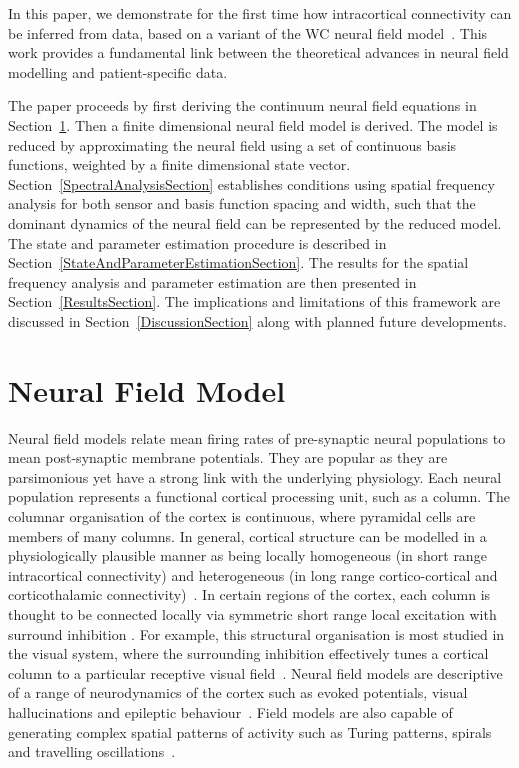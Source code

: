 \documentclass[10pt,a4paper]{article}
\begin{document}
In this paper, we demonstrate for the first time how intracortical connectivity can be inferred from data, based on a variant of the WC neural field model~\cite{Wilson1973}. This work provides a fundamental link between the theoretical advances in neural field modelling and patient-specific data.

The paper proceeds by first deriving the continuum neural field equations in Section~\ref{NeuralModelSection}. Then a finite dimensional neural field model is derived. The model is reduced by approximating the neural field using a set of continuous basis functions, weighted by a finite dimensional state vector. Section~\ref{SpectralAnalysisSection} establishes conditions using spatial frequency analysis for both sensor and basis function spacing and width, such that the dominant dynamics of the neural field can be represented by the reduced model. The state and parameter estimation procedure is described in Section~\ref{StateAndParameterEstimationSection}. The results for the spatial frequency analysis and parameter estimation are then presented in Section~\ref{ResultsSection}. The implications and limitations of this framework are discussed in Section~\ref{DiscussionSection} along with planned future developments.

\section{Neural Field Model}\label{NeuralModelSection} 

Neural field models relate mean firing rates of pre-synaptic neural populations to mean post-synaptic membrane potentials. They are popular as they are parsimonious yet have a strong link with the underlying physiology. Each neural population represents a functional cortical processing unit, such as a column. The columnar organisation of the cortex is continuous, where pyramidal cells are members of many columns. In general, cortical structure can be modelled in a physiologically plausible manner as being locally homogeneous (in short range intracortical connectivity) and heterogeneous (in long range cortico-cortical and corticothalamic connectivity)~\cite{Jirsa2009,Qubbaj2007}. In certain regions of the cortex, each column is thought to be connected locally via symmetric short range local excitation with surround inhibition \cite{Braitenberg1998}. For example, this structural organisation is most studied in the visual system, where the surrounding inhibition effectively tunes a cortical column to a particular receptive visual field~\cite{Sullivan2006}. Neural field models are descriptive of a range of neurodynamics of the cortex such as evoked potentials, visual hallucinations and epileptic behaviour~\cite{David2003,Bressloff2001,Breakspear2006}. Field models are also capable of generating complex spatial patterns of activity such as Turing patterns, spirals and travelling oscillations~\cite{Amari1977,Coombes2005,Coombes2007}.
\end{document}
